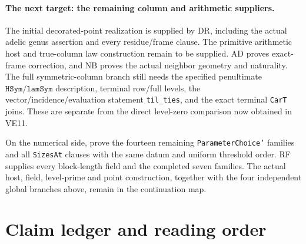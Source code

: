 \documentclass[11pt,a4paper]{article}
\numberwithin{equation}{section}
\theoremstyle{remark}\newtheorem{remark}[theorem]{Remark}
\begin{document}
\paragraph{The next target: the remaining column and arithmetic suppliers.}
The initial decorated-point realization is supplied by DR, including
the actual adelic genus assertion and every residue/frame clause.
The primitive arithmetic host and true-column law construction remain
to be supplied. AD proves exact-frame correction, and NB proves the
actual neighbor geometry and naturality.
The full symmetric-column branch still needs the specified penultimate
$\texttt{HSym}/\texttt{lamSym}$ description, terminal row/full levels,
the vector/incidence/evaluation statement \texttt{til\_ties}, and the
exact terminal \texttt{CarT} joins. These are separate from the direct
level-zero comparison now obtained in VE11.

On the numerical side, prove the fourteen remaining
\texttt{ParameterChoice'} families and all \texttt{SizesAt} clauses
with the same datum and uniform threshold order. RF supplies every
block-length field and the completed seven families. The actual host,
field, level-prime and point construction, together with the four
independent global branches above, remain in the continuation map.


\section{Claim ledger and reading order}
\end{document}
